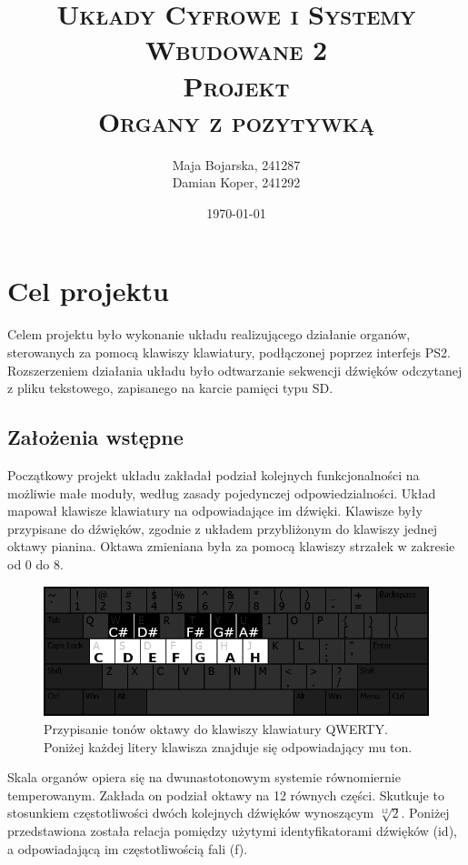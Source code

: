 \documentclass[a4paper,12pt]{article}
\title{ 
    \vspace*{50mm}
    \textsc{
        \textbf{Układy Cyfrowe i Systemy Wbudowane 2}\\
        \large Projekt \\
         Organy z pozytywką
    }
}
\author{
Maja Bojarska, 241287\\
Damian Koper,  241292\\
}
\date{\today}
\begin{document}
\maketitle

\clearpage

\setcounter{tocdepth}{2}
\tableofcontents

\clearpage

\section{Cel projektu}

Celem projektu było wykonanie układu realizującego działanie organów, sterowanych za pomocą klawiszy klawiatury, podłączonej poprzez interfejs PS2. Rozszerzeniem działania układu było odtwarzanie sekwencji dźwięków odczytanej z pliku tekstowego, zapisanego na karcie pamięci typu SD.

\subsection{Założenia wstępne}

Początkowy projekt układu zakładał podział kolejnych funkcjonalności na możliwie małe moduły, według zasady pojedynczej odpowiedzialności. Układ mapował klawisze klawiatury na odpowiadające im dźwięki. Klawisze były przypisane do dźwięków, zgodnie z układem przybliżonym do klawiszy jednej oktawy pianina.  Oktawa zmieniana była za pomocą klawiszy strzałek w zakresie od 0 do 8.

\begin{figure}[H]
  \centering
  \includegraphics[width=\linewidth]{images/key_mapping.png}
  \caption{Przypisanie tonów oktawy do klawiszy klawiatury QWERTY. Poniżej każdej litery klawisza znajduje się odpowiadający mu ton.}
  \label{key_mapping}
\end{figure}

Skala organów opiera się na dwunastotonowym systemie równomiernie temperowanym. Zakłada on podział oktawy na 12 równych części. Skutkuje to stosunkiem częstotliwości dwóch kolejnych dźwięków wynoszącym \(\sqrt[12]{2}\). Poniżej przedstawiona została relacja pomiędzy użytymi identyfikatorami dźwięków (id), a odpowiadającą im częstotliwością fali (f).
\end{document}
